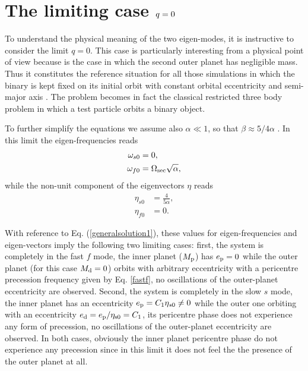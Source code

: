 \documentclass[usenatbib,a4paper,times,fleqn]{mnras}
\begin{document}
\appendix
\onecolumn

\section{The limiting case $\lowercase{q}=0$}\label{caseq0}
 
To understand the physical meaning of the two eigen-modes, it is instructive to consider the limit $q=0$. This case is particularly interesting from a physical point of view because is the case in which the second outer planet has negligible mass. Thus it constitutes the reference situation for all those simulations in which the binary is kept fixed on its initial orbit with constant orbital eccentricity and semi-major axis \citep{dangelo2006,muller2013,duffell2015,thun2017}. The problem becomes in fact the classical restricted three body problem in which a test particle orbits a binary object. 

To further simplify the equations we assume also $\alpha\ll 1$, so that $\beta\approx 5/4 \alpha$ \citep{murray1999}. In this limit the eigen-frequencies reads
\begin{align}
\omega_{s0} &=0,\\
\omega_{f0}&=\Omega_{\rm sec}\sqrt{\alpha},\label{fastf}
\end{align} 
while the non-unit component of the eigenvectors $\eta$ reads
\begin{align}
\eta_{s0} &=\frac{4}{5\alpha},\\
 \eta_{f0}&=0.
\end{align}

With reference to Eq. (\ref{generalsolution1}), these values for eigen-frequencies and eigen-vectors imply the following two limiting cases: first, the system is completely in the fast $f$ mode, the inner planet ($M_{\rm p}$) has $e_{\rm p}=0$ while the outer planet (for this case $M_{\rm d}=0$) orbits with arbitrary eccentricity with a pericentre precession frequency given by Eq. \ref{fastf}, no oscillations of the outer-planet eccentricity are observed. Second, the system is completely in the slow $s$ mode, the inner planet has an eccentricity $e_{\rm p}=C_1\eta_{s0}\neq 0$ while the outer one orbiting with an eccentricity $e_{\rm d}=e_{\rm p}/\eta_{\rm s0}=C_1$, its pericentre phase does not experience any form of precession, no oscillations of the outer-planet eccentricity are observed. In both cases, obviously the inner planet pericentre phase do not experience any precession since in this limit it does not feel the the presence of the outer planet at all. 
\end{document}
